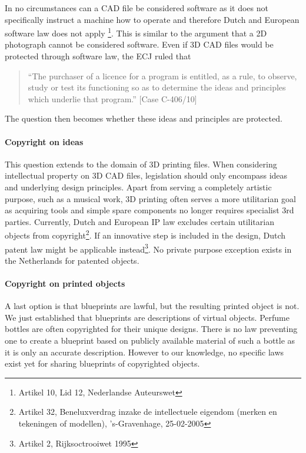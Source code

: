 In no circumstances can a CAD file be considered software as it does not 
specifically instruct a machine how to operate and therefore Dutch and European 
software law does not apply \footnote{Artikel 10, Lid 12, Nederlandse Auteurswet}.
This is similar to the argument that a 2D photograph cannot be considered 
software.
Even if 3D CAD files would be protected through software law, the ECJ ruled 
that 
\begin{quote}``The purchaser of a licence for a program is entitled, as a rule, to 
observe, study or test its functioning so as to determine the ideas and 
principles which underlie that program.'' [Case C-406/10]\end{quote}
The question then becomes whether these ideas and principles are protected.

\paragraph{Copyright on ideas}
This question extends to the domain of 3D printing files.
When considering intellectual property on 3D CAD files, legislation should only 
encompass ideas and underlying design principles.
Apart from serving a completely artistic purpose, such as a musical work, 3D 
printing often serves a more utilitarian goal as acquiring tools and simple 
spare components no longer requires specialist 3rd parties.
Currently, Dutch and European IP law excludes certain utilitarian objects from 
copyright\footnote{Artikel 32, Beneluxverdrag inzake de intellectuele eigendom (merken en tekeningen of modellen), 's-Gravenhage, 25-02-2005}.
If an innovative step is included in the design, Dutch patent law might be 
applicable instead\footnote{Artikel 2, Rijksoctrooiwet 1995}.
No private purpose exception exists in the Netherlands for patented objects.

\paragraph{Copyright on printed objects}
A last option is that blueprints are lawful, but the resulting printed object is not.
We just established that blueprints are descriptions of virtual objects.
Perfume bottles are often copyrighted for their unique designs.
There is no law preventing one to create a blueprint based on publicly available material of such a bottle as it is only an accurate description.
However to our knowledge, no specific laws exist yet for sharing blueprints of copyrighted objects.

